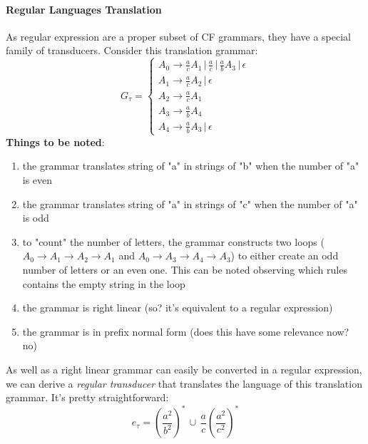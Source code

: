 				\paragraph{Regular Languages Translation}
					As regular expression are a proper subset of CF grammars, they have a special family of transducers. Consider this translation grammar:
					\begin{equation}
						G_\tau = 
						\begin{cases}
							A_0 \rightarrow \frac{a}{c}A_1 \,\vert\, \frac{a}{c} \,\vert\, \frac{a}{b}A_3 \,\vert\, \epsilon \\
							A_1 \rightarrow \frac{a}{c}A_2 \,\vert\, \epsilon \\
							A_2 \rightarrow \frac{a}{c}A_1 \\
							A_3 \rightarrow \frac{a}{b}A_4 \\
							A_4 \rightarrow \frac{a}{b}A_3 \,\vert\, \epsilon 
						\end{cases}
					\end{equation}
					\textbf{Things to be noted}:
					\begin{enumerate}
						\item the grammar translates string of "a" in strings of "b" when the number of "a" is even
						\item the grammar translates string of "a" in strings of "c" when the number of "a" is odd
						\item to "count" the number of letters, the grammar constructs two loops ($A_0 \rightarrow A_1 \rightarrow A_2 \rightarrow A_1$ and 
						$A_0 \rightarrow A_3 \rightarrow A_4 \rightarrow A_3$) to either create an odd number of letters or an even one. This can be noted observing 
						which rules contains the empty string in the loop
						\item the grammar is right linear (so? it's equivalent to a regular expression)
						\item the grammar is in prefix normal form (does this have some relevance now? no)
					\end{enumerate}
					As well as a right linear grammar can easily be converted in a regular expression, we can derive a \emph{regular transducer} that translates the 
					language of this translation grammar. It's pretty straightforward:
					\begin{equation}
						e_\tau = \left(\frac{a^2}{b^2} \right)^\ast \,\cup\, \frac{a}{c} \left(\frac{a^2}{c^2} \right)^\ast
					\end{equation}
					
